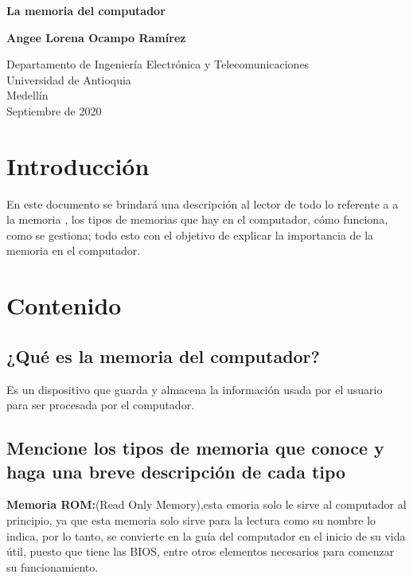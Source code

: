 \documentclass{article}
\begin{document}
\begin{titlepage}
    \begin{center}
        \vspace*{1cm}
            
        \Huge
        \textbf{La memoria del computador}\par
        \vspace{0.5cm}
        \LARGE
        \vspace{1.5cm}
            
        \textbf{Angee Lorena Ocampo Ramírez}
            
        \vfill
            
        \vspace{0.8cm}
            
        \Large
        Departamento de Ingeniería Electrónica y Telecomunicaciones\\
        Universidad de Antioquia\\
        Medellín\\
        Septiembre de 2020
            
    \end{center}
\end{titlepage}

\tableofcontents\newpage

\section{Introducción}
En este documento se brindará una descripción al lector de todo lo referente a a la memoria , los tipos de memorias que hay en el computador, cómo funciona, como se gestiona; todo esto con el objetivo de explicar la importancia de la memoria en el computador.\par

\section{Contenido} \label{contenido}
\subsection{¿Qué es la memoria del computador?}\par
Es un dispositivo que guarda y almacena la información usada por el usuario para ser procesada por el computador.
\subsection{Mencione los tipos de memoria que conoce y haga una breve descripción de cada tipo}\par
\textbf{Memoria ROM:}(Read Only Memory),esta emoria solo le sirve al computador al principio, ya que esta memoria solo sirve para la lectura como su nombre lo indica, por lo tanto, se convierte en la guía del computador en el inicio de su vida útil, puesto que tiene las BIOS, entre otros elementos necesarios para comenzar su funcionamiento.\par
\end{document}
